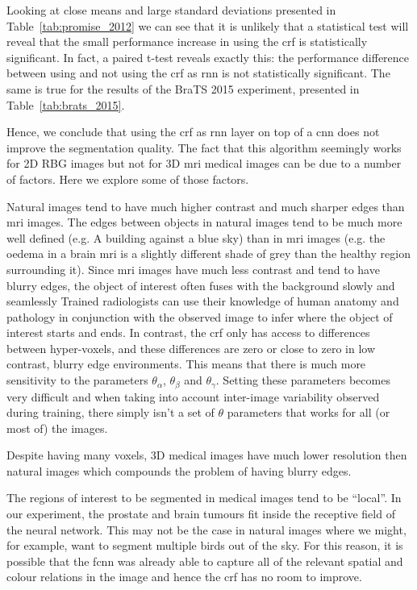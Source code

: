 \documentclass{article}
\begin{document}
Looking at close means and large standard deviations presented in Table~\ref{tab:promise_2012} we can see that it is unlikely that a statistical test will reveal that the small performance increase in using the \gls{crf} is statistically significant. 
In fact, a paired t-test reveals exactly this: the performance difference between using and not using the \gls{crf} as \gls{rnn} is not statistically significant. 
The same is true for the results of the BraTS 2015 experiment, presented in Table~\ref{tab:brats_2015}.

Hence, we conclude that using the \gls{crf} as \gls{rnn} layer on top of a \gls{cnn} does not improve the segmentation quality.
The fact that this algorithm seemingly works for 2D RBG images \cite{CRFasRNN} but not for 3D \gls{mri} medical images can be due to a number of factors. 
Here we explore some of those factors.

Natural images tend to have much higher contrast and much sharper edges than \gls{mri} images.
The edges between objects in natural images tend to be much more well defined (e.g. A building against a blue sky) than in \gls{mri} images (e.g. the oedema in a brain \gls{mri} is a slightly different shade of grey than the healthy region surrounding it).
Since \gls{mri} images have much less contrast and tend to have blurry edges, the object of interest often fuses with the background slowly and seamlessly 
Trained radiologists can use their knowledge of human anatomy and pathology in conjunction with the observed image to infer where the object of interest starts and ends.
In contrast, the \gls{crf} only has access to differences between hyper-voxels, and these differences are zero or close to zero in low contrast, blurry edge environments.
This means that there is much more sensitivity to the parameters $\theta_\alpha$, $\theta_\beta$ and $\theta_\gamma$. Setting these parameters becomes very difficult and when taking into account inter-image variability observed during training, there simply isn't a set of $\theta$ parameters that works for all (or most of) the images. 
    
Despite having many voxels, 3D medical images have much lower resolution then natural images which compounds the problem of having blurry edges.

The regions of interest to be segmented in medical images tend to be ``local''. In our experiment, the prostate and brain tumours fit inside the receptive field of the neural network.
This may not be the case in natural images where we might, for example, want to segment multiple birds out of the sky. 
For this reason, it is possible that the \gls{fcnn} was already able to capture all of the relevant spatial and colour relations in the image and hence the \gls{crf} has no room to improve.
\end{document}
